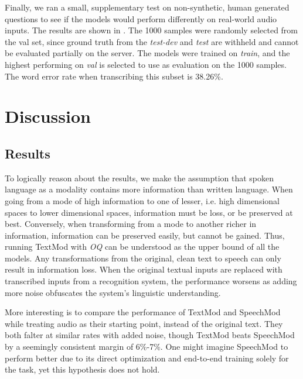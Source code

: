 \documentclass[letterpaper]{article} %
\begin{document}
Finally, we ran a small, supplementary test on non-synthetic, human generated questions to see if the models would perform differently on real-world audio inputs. The results are shown in . The 1000 samples were randomly selected from the val set, since ground truth from the \textit{test-dev} and \textit{test} are withheld and cannot be evaluated partially on the server. The models were trained on \textit{train}, and the highest performing on \textit{val} is selected to use as evaluation on the 1000 samples. The word error rate when transcribing this subset is 38.26\%.


\section{Discussion}
\label{sec:discussion}
\subsection{Results}

To logically reason about the results, we make the assumption that spoken language as a modality contains more information than written language. When going from a mode of high information to one of lesser, i.e. high dimensional spaces to lower dimensional spaces, information must be loss, or be preserved at best. Conversely, when transforming from a mode to another richer in information, information can be preserved easily, but cannot be gained. Thus, running TextMod with \textit{OQ} can be understood as the upper bound of all the models. Any transformations from the original, clean text to speech can only result in information loss. When the original textual inputs are replaced with transcribed inputs from a recognition system, the performance worsens as adding more noise obfuscates the system's linguistic understanding.

More interesting is to compare the performance of TextMod and SpeechMod while treating audio as their starting point, instead of the original text. They both falter at similar rates with added noise, though TextMod beats SpeechMod by a seemingly consistent margin of 6\%-7\%. One might imagine SpeechMod to perform better due to its direct optimization and end-to-end training solely for the task, yet this hypothesis does not hold.
\end{document}
